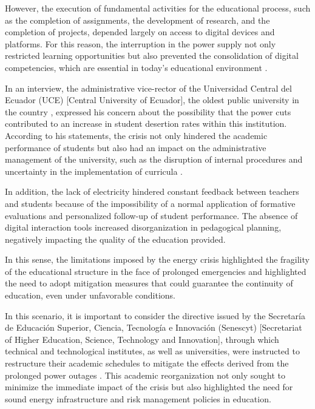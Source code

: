 \documentclass[english]{textolivre}
\begin{document}
However, the execution of fundamental activities for the educational process, such as the completion of assignments, the development of research, and the completion of projects, depended largely on access to digital devices and platforms. For this reason, the interruption in the power supply not only restricted learning opportunities but also prevented the consolidation of digital competencies, which are essential in today’s educational environment \cite{orellana2024educacion}.

In an interview, the administrative vice-rector of the Universidad Central del Ecuador (UCE) [Central University of Ecuador], the oldest public university in the country \cite{elcomercio2011universidad}, expressed his concern about the possibility that the power cuts contributed to an increase in student desertion rates within this institution. According to his statements, the crisis not only hindered the academic performance of students but also had an impact on the administrative management of the university, such as the disruption of internal procedures and uncertainty in the implementation of curricula \cite{davila2024apagones}.

In addition, the lack of electricity hindered constant feedback between teachers and students because of the impossibility of a normal application of formative evaluations and personalized follow-up of student performance. The absence of digital interaction tools increased disorganization in pedagogical planning, negatively impacting the quality of the education provided.

In this sense, the limitations imposed by the energy crisis highlighted the fragility of the educational structure in the face of prolonged emergencies and highlighted the need to adopt mitigation measures that could guarantee the continuity of education, even under unfavorable conditions.

In this scenario, it is important to consider the directive issued by the Secretaría de Educación Superior, Ciencia, Tecnología e Innovación (Senescyt) [Secretariat of Higher Education, Science, Technology and Innovation], through which technical and technological institutes, as well as universities, were instructed to restructure their academic schedules to mitigate the effects derived from the prolonged power outages \cite{teleamazonas2024cortesluz}. This academic reorganization not only sought to minimize the immediate impact of the crisis but also highlighted the need for sound energy infrastructure and risk management policies in education.
\end{document}
